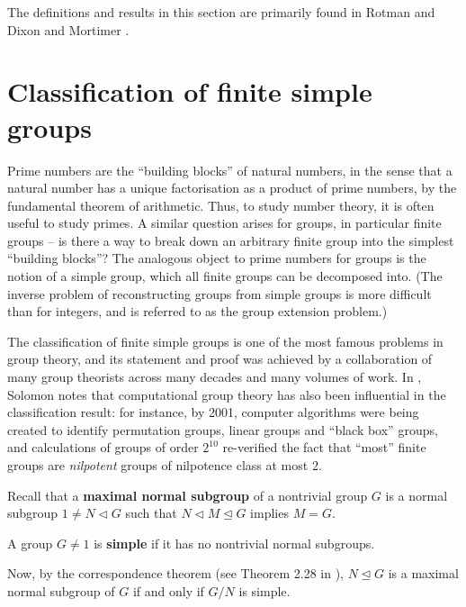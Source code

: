 The definitions and results in this section are primarily found in Rotman \cite{rotman_intro_theory_groups1995} and Dixon and Mortimer \cite{dixon_mortimer_perm_groups1996}.

\section{Classification of finite simple groups}

Prime numbers are the ``building blocks'' of natural numbers, in the sense that a natural number has a unique factorisation as a product of prime numbers, by the fundamental theorem of arithmetic. Thus, to study number theory, it is often useful to study primes. A similar question arises for groups, in particular finite groups -- is there a way to break down an arbitrary finite group into the simplest ``building blocks''? The analogous object to prime numbers for groups is the notion of a simple group, which all finite groups can be decomposed into. (The inverse problem of reconstructing groups from simple groups is more difficult than for integers, and is referred to as the group extension problem.)

The classification of finite simple groups is one of the most famous problems in group theory, and its statement and proof was achieved by a collaboration of many group theorists across many decades and many volumes of work. In \cite{solomon2001}, Solomon notes that computational group theory has also been influential in the classification result: for instance, by 2001, computer algorithms were being created to identify permutation groups, linear groups and ``black box'' groups, and calculations of groups of order $2^{10}$ re-verified the fact that ``most'' finite groups are \textit{nilpotent} groups of nilpotence class at most 2.

Recall that a \textbf{maximal normal subgroup} of a nontrivial group $G$ is a normal subgroup $1 \neq N \lhd G$ such that $N \lhd M \unlhd G$ implies $M = G$.

\begin{definition}\label{def:simple_group}
    A group $G \neq 1$ is \textbf{simple} if it has no nontrivial normal subgroups.
\end{definition}

 Now, by the correspondence theorem (see Theorem 2.28 in \cite{rotman_intro_theory_groups1995}), $N \unlhd G$ is a maximal normal subgroup of $G$ if and only if $G/N$ is simple. 

